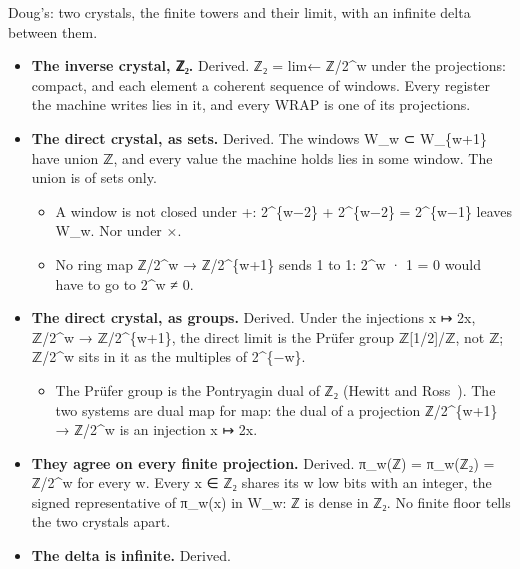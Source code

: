 Doug's: two crystals, the finite towers and their limit, with an infinite delta between them.

\begin{itemize}
\item \textbf{The inverse crystal, ℤ₂.} Derived. ℤ₂ = lim← ℤ/2\textasciicircum{}w under the projections: compact, and each element a coherent sequence of windows. Every register the machine writes lies in it, and every WRAP is one of its projections.
\item \textbf{The direct crystal, as sets.} Derived. The windows W\_\allowbreak{}w ⊂ W\_\allowbreak{}\{w+1\} have union ℤ, and every value the machine holds lies in some window. The union is of sets only.

\begin{itemize}
\item A window is not closed under +: 2\textasciicircum{}\{w−2\} + 2\textasciicircum{}\{w−2\} = 2\textasciicircum{}\{w−1\} leaves W\_\allowbreak{}w. Nor under ×.
\item No ring map ℤ/2\textasciicircum{}w → ℤ/2\textasciicircum{}\{w+1\} sends 1 to 1: 2\textasciicircum{}w · 1 = 0 would have to go to 2\textasciicircum{}w ≠ 0.
\end{itemize}
\item \textbf{The direct crystal, as groups.} Derived. Under the injections x ↦ 2x, ℤ/2\textasciicircum{}w → ℤ/2\textasciicircum{}\{w+1\}, the direct limit is the Prüfer group ℤ[1/2]/ℤ, not ℤ; ℤ/2\textasciicircum{}w sits in it as the multiples of 2\textasciicircum{}\{−w\}.

\begin{itemize}
\item The Prüfer group is the Pontryagin dual of ℤ₂ (Hewitt and Ross~\cite{src:Hewitt-and-Ross-1963}). The two systems are dual map for map: the dual of a projection ℤ/2\textasciicircum{}\{w+1\} → ℤ/2\textasciicircum{}w is an injection x ↦ 2x.
\end{itemize}
\item \textbf{They agree on every finite projection.} Derived. π\_\allowbreak{}w(ℤ) = π\_\allowbreak{}w(ℤ₂) = ℤ/2\textasciicircum{}w for every w. Every x ∈ ℤ₂ shares its w low bits with an integer, the signed representative of π\_\allowbreak{}w(x) in W\_\allowbreak{}w: ℤ is dense in ℤ₂. No finite floor tells the two crystals apart.
\item \textbf{The delta is infinite.} Derived.


\end{itemize}

